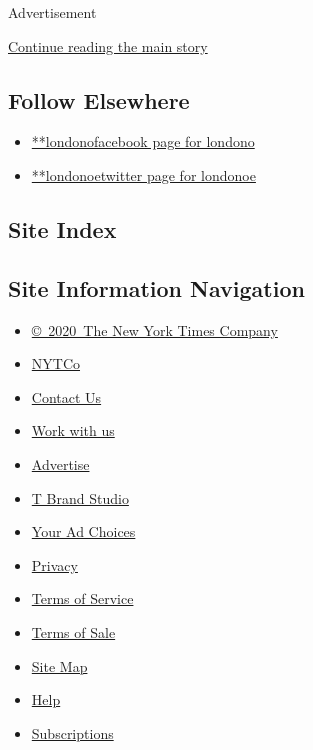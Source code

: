Advertisement

\protect\hyperlink{after-mid2}{Continue reading the main story}

\hypertarget{follow-elsewhere}{%
\subsection{Follow Elsewhere}\label{follow-elsewhere}}

\begin{itemize}
\tightlist
\item
  \href{https://www.facebookcorewwwi.onion/londono}{**londonofacebook
  page for londono}
\item
  \href{https://twitter.com/londonoe}{**londonoetwitter page for
  londonoe}
\end{itemize}

\hypertarget{site-index}{%
\subsection{Site Index}\label{site-index}}

\hypertarget{site-information-navigation}{%
\subsection{Site Information
Navigation}\label{site-information-navigation}}

\begin{itemize}
\tightlist
\item
  \href{https://help.nytimes3xbfgragh.onion/hc/en-us/articles/115014792127-Copyright-notice}{©~2020~The
  New York Times Company}
\end{itemize}

\begin{itemize}
\tightlist
\item
  \href{https://www.nytco.com/}{NYTCo}
\item
  \href{https://help.nytimes3xbfgragh.onion/hc/en-us/articles/115015385887-Contact-Us}{Contact
  Us}
\item
  \href{https://www.nytco.com/careers/}{Work with us}
\item
  \href{https://nytmediakit.com/}{Advertise}
\item
  \href{http://www.tbrandstudio.com/}{T Brand Studio}
\item
  \href{https://www.nytimes3xbfgragh.onion/privacy/cookie-policy\#how-do-i-manage-trackers}{Your
  Ad Choices}
\item
  \href{https://www.nytimes3xbfgragh.onion/privacy}{Privacy}
\item
  \href{https://help.nytimes3xbfgragh.onion/hc/en-us/articles/115014893428-Terms-of-service}{Terms
  of Service}
\item
  \href{https://help.nytimes3xbfgragh.onion/hc/en-us/articles/115014893968-Terms-of-sale}{Terms
  of Sale}
\item
  \href{https://spiderbites.nytimes3xbfgragh.onion}{Site Map}
\item
  \href{https://help.nytimes3xbfgragh.onion/hc/en-us}{Help}
\item
  \href{https://www.nytimes3xbfgragh.onion/subscription?campaignId=37WXW}{Subscriptions}
\end{itemize}
